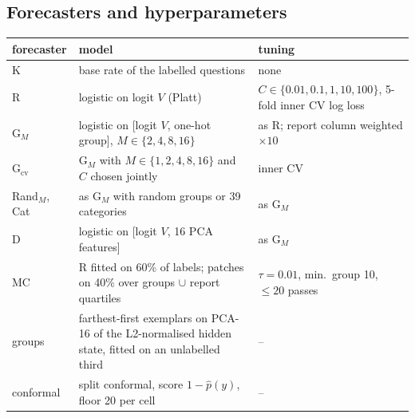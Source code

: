 \documentclass[11pt]{article}
\theoremstyle{definition}
\theoremstyle{remark}
\newcommand{\1}{\mathbf{1}}
\begin{document}
\subsection{Forecasters and hyperparameters}
\label{app:hyper}
\begin{center}\small
\begin{tabular}{lll}
\toprule
forecaster & model & tuning\\
\midrule
K & base rate of the labelled questions & none\\
R & logistic on logit $V$ (Platt) & $C\in\{0.01,0.1,1,10,100\}$, 5-fold inner CV log loss\\
G$_M$ & logistic on [logit $V$, one-hot group], $M\in\{2,4,8,16\}$ & as R; report column weighted $\times10$\\
G$_{\mathrm{cv}}$ & G$_M$ with $M\in\{1,2,4,8,16\}$ and $C$ chosen jointly & inner CV\\
Rand$_M$, Cat & as G$_M$ with random groups or 39 categories & as G$_M$\\
D & logistic on [logit $V$, 16 PCA features] & as G$_M$\\
MC & R fitted on 60\% of labels; patches on 40\% over groups $\cup$ report quartiles & $\tau=0.01$, min.\ group 10, $\le20$ passes\\
\midrule
groups & farthest-first exemplars on PCA-16 of the L2-normalised hidden state, fitted on an unlabelled third & --\\
conformal & split conformal, score $1-\hat p(y)$, floor 20 per cell & --\\
\bottomrule
\end{tabular}
\end{center}
\end{document}
